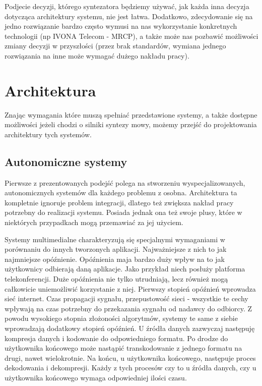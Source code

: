 Podjecie decyzji, którego syntezatora będziemy używać, jak każda inna decyzja dotycząca architektury systemu, nie jest łatwa. Dodatkowo, zdecydowanie się na jedno rozwiązanie bardzo często wymusi na nas wykorzystanie konkretnych technologii (np IVONA Telecom - MRCP), a także może nas pozbawić możliwości zmiany decyzji w przyszłości (przez brak standardów, wymiana jednego rozwiązania na inne może wymagać dużego nakładu pracy).

\section {Architektura}

Znając wymagania które muszą spełniać przedstawione systemy, a także dostępne możliwości jeżeli chodzi o silniki syntezy mowy,  możemy przejść do projektowania architektury tych systemów.

\subsection {Autonomiczne systemy}
Pierwsze z prezentowanych podejść polega na stworzeniu wyspecjalizowanych, autonomicznych systemów dla każdego problemu z osobna. Architektura ta kompletnie ignoruje problem integracji, dlatego też zwiększa nakład pracy potrzebny do realizacji systemu.  Posiada jednak ona też swoje plusy, które w niektórych przypadkach mogą przemawiać za jej użyciem. 

Systemy multimedialne charakteryzują się specjalnymi wymaganiami w porównaniu do innych tworzonych aplikacji. Najważniejsze z nich to jak najmniejsze opóźnienie. Opóźnienia maja bardzo duży wpływ na to jak użytkownicy odbierają daną aplikacje. Jako przykład niech posłuży platforma telekonferencji. Duże opóźnienia nie tylko utrudniają, lecz również mogą całkowicie uniemożliwić korzystanie z niej. Pierwszy stopień opóźnień wprowadza sieć internet. Czas propagacji sygnału, przepustowość sieci - wszystkie te cechy wpływają na czas potrzebny do przekazania sygnału od nadawcy do odbiorcy. Z powodu wysokiego stopnia złożoności algorytmów, systemy te same z siebie wprowadzają dodatkowy stopień opóźnień. U źródła danych zazwyczaj następuję kompresja danych i kodowanie do odpowiedniego formatu. Po drodze do użytkownika końcowego może nastąpić transkodowanie z jednego formatu na drugi, nawet wielokrotnie. Na końcu, u użytkownika końcowego, następuje proces dekodowania i dekompresji. Każdy z tych procesów czy to u źródła danych, czy u użytkownika końcowego wymaga odpowiedniej ilości czasu. 

